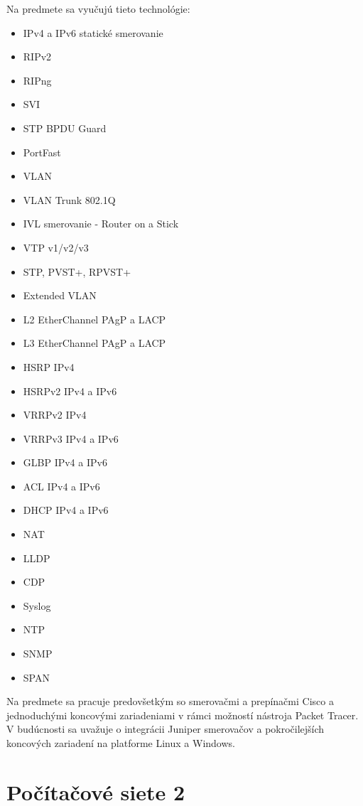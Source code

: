 Na predmete sa vyučujú tieto technológie:

\begin{itemize}[noitemsep]
    \item IPv4 a IPv6 statické smerovanie
    \item RIPv2
    \item RIPng
    \item SVI
    \item STP BPDU Guard
    \item PortFast
    \item VLAN
    \item VLAN Trunk 802.1Q
    \item IVL smerovanie - Router on a Stick
    \item VTP v1/v2/v3
    \item STP, PVST+, RPVST+
    \item Extended VLAN
    \item L2 EtherChannel PAgP a LACP
    \item L3 EtherChannel PAgP a LACP
    \item HSRP IPv4 
    \item HSRPv2 IPv4 a IPv6 
    \item VRRPv2 IPv4 
    \item VRRPv3 IPv4 a IPv6 
    \item GLBP IPv4 a IPv6 
    \item ACL IPv4 a IPv6 
    \item DHCP IPv4 a IPv6 
    \item NAT
    \item LLDP
    \item CDP
    \item Syslog
    \item NTP
    \item SNMP
    \item SPAN
\end{itemize}

Na predmete sa pracuje predovšetkým so smerovačmi a prepínačmi Cisco a jednoduchými koncovými zariadeniami v rámci možností nástroja Packet Tracer. V budúcnosti sa uvažuje o integrácii Juniper smerovačov a pokročilejších koncových zariadení na platforme Linux a Windows.




\section{Počítačové siete 2}


